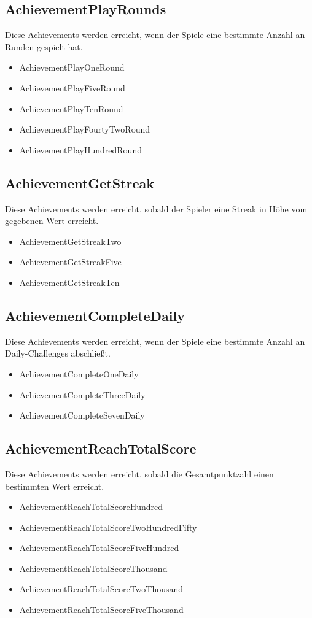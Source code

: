 \documentclass[a4paper]{scrreprt}
\begin{document}
	\subsection{AchievementPlayRounds}
	Diese Achievements werden erreicht, wenn der Spiele eine bestimmte Anzahl an Runden gespielt hat. \\
	\begin{itemize}
		\item AchievementPlayOneRound
		\item AchievementPlayFiveRound
		\item AchievementPlayTenRound
		\item AchievementPlayFourtyTwoRound
		\item AchievementPlayHundredRound
	\end{itemize}

	\subsection{AchievementGetStreak}
	Diese Achievements werden erreicht, sobald der Spieler eine Streak in Höhe vom gegebenen Wert erreicht. \\
	\begin{itemize}
		\item AchievementGetStreakTwo
		\item AchievementGetStreakFive
		\item AchievementGetStreakTen
	\end{itemize}

	\subsection{AchievementCompleteDaily}
	Diese Achievements werden erreicht, wenn der Spiele eine bestimmte Anzahl an Daily-Challenges abschließt. \\
	\begin{itemize}
		\item AchievementCompleteOneDaily
		\item AchievementCompleteThreeDaily
		\item AchievementCompleteSevenDaily
	\end{itemize}

	\subsection{AchievementReachTotalScore}
	Diese Achievements werden erreicht, sobald die Gesamtpunktzahl einen bestimmten Wert erreicht. \\
	\begin{itemize}
		\item AchievementReachTotalScoreHundred
		\item AchievementReachTotalScoreTwoHundredFifty
		\item AchievementReachTotalScoreFiveHundred
		\item AchievementReachTotalScoreThousand
		\item AchievementReachTotalScoreTwoThousand
		\item AchievementReachTotalScoreFiveThousand
	\end{itemize}
\end{document}
